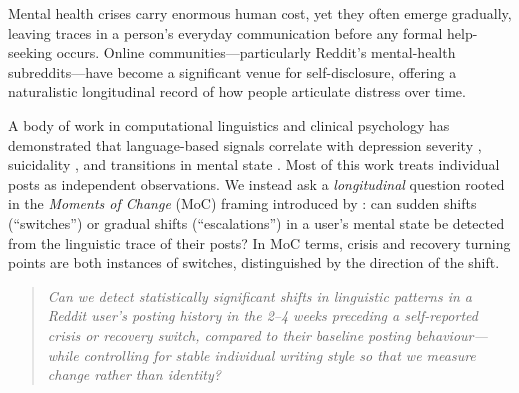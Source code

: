 \documentclass[11pt]{article}
\begin{document}
Mental health crises carry enormous human cost, yet they often emerge
gradually, leaving traces in a person's everyday communication before
any formal help-seeking occurs.
Online communities---particularly Reddit's mental-health subreddits---have
become a significant venue for self-disclosure, offering a naturalistic
longitudinal record of how people articulate distress over time.

A body of work in computational linguistics and clinical psychology
has demonstrated that language-based signals correlate with depression
severity \citep{dechoudhury2013predicting,coppersmith2014quantifying},
suicidality \citep{yates2017depression,shing2018expert}, and transitions
in mental state \citep{gkotsis2016language}.
Most of this work treats individual posts as independent observations.
We instead ask a \emph{longitudinal} question rooted in the
\emph{Moments of Change} (MoC) framing introduced by
\citet{tsakalidis2022identifying}: can sudden shifts
(``switches'') or gradual shifts (``escalations'') in a user's
mental state be detected from the linguistic trace of their posts?
In MoC terms, crisis and recovery turning points are both instances of
switches, distinguished by the direction of the shift.

\begin{quote}
\textit{Can we detect statistically significant shifts in linguistic
patterns in a Reddit user's posting history in the 2--4 weeks preceding
a self-reported crisis or recovery switch, compared to their baseline
posting behaviour---while controlling for stable individual writing
style so that we measure change rather than identity?}
\end{quote}
\end{document}
